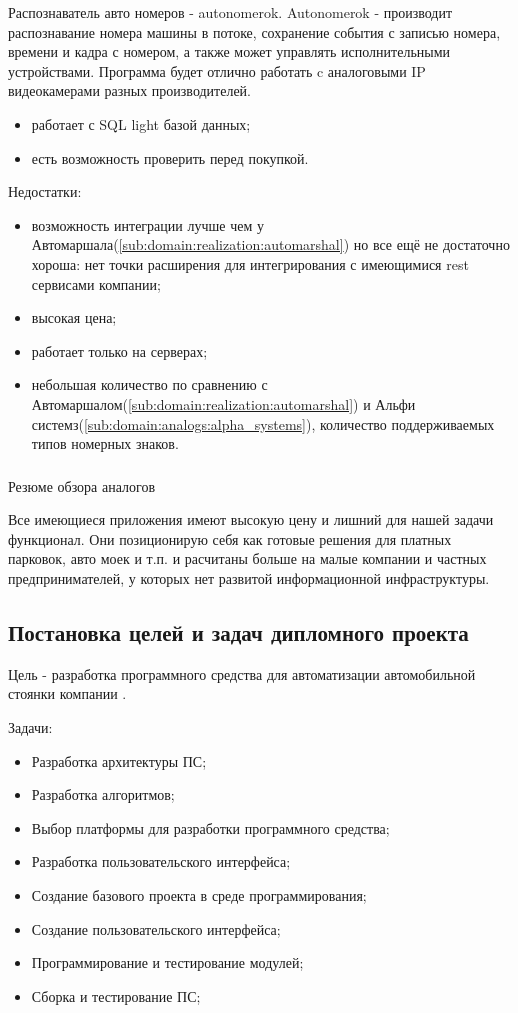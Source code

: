 Распознаватель авто номеров - autonomerok. Autonomerok - производит распознавание номера машины в потоке, сохранение события с записью номера, времени и кадра с номером, а также может управлять исполнительными устройствами. Программа будет отлично работать c аналоговыми IP видеокамерами разных производителей.
\begin{itemize}
  \item работает с SQL light базой данных;
  \item есть возможность проверить перед покупкой.
\end{itemize}
Недостатки:
\begin{itemize}
  \item возможность интеграции лучше чем у Автомаршала(\ref{sub:domain:realization:automarshal}) но все ещё не достаточно хороша: нет точки расширения для интегрирования с имеющимися rest сервисами компании;
  \item высокая цена;
  \item работает только на \windows{} серверах;
  \item небольшая количество по сравнению с Автомаршалом(\ref{sub:domain:realization:automarshal}) и Альфи системз(\ref{sub:domain:analogs:alpha_systems}), количество поддерживаемых типов номерных знаков.
\end{itemize}

\subsubsection{}
Резюме обзора аналогов

Все имеющиеся приложения имеют высокую цену и лишний для нашей задачи функционал. Они позиционирую себя как готовые решения для платных парковок, авто моек и т.п. и расчитаны больше на малые компании и частных предпринимателей, у которых нет развитой информационной инфраструктуры. 

\subsection{Постановка целей и задач дипломного проекта}
Цель - разработка программного средства для автоматизации автомобильной стоянки компании \company{}.

Задачи:
\begin{itemize}
  \item Разработка архитектуры ПС;
  \item Разработка алгоритмов;
  \item Выбор платформы для разработки программного средства;
  \item Разработка пользовательского интерфейса;
  \item Создание базового проекта в среде программирования;
  \item Создание пользовательского интерфейса;
  \item Программирование и тестирование модулей;
  \item Сборка и тестирование ПС;
\end{itemize}
